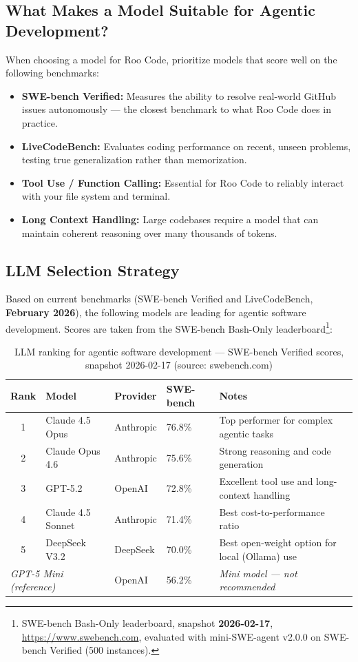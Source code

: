 \subsection{What Makes a Model Suitable for Agentic Development?}

When choosing a model for Roo Code, prioritize models that score well on the
following benchmarks:
\begin{itemize}
   \item \textbf{SWE-bench Verified:} Measures the ability to resolve
      real-world GitHub issues autonomously — the closest benchmark to what
      Roo Code does in practice.
   \item \textbf{LiveCodeBench:} Evaluates coding performance on recent,
      unseen problems, testing true generalization rather than memorization.
   \item \textbf{Tool Use / Function Calling:} Essential for Roo Code to
      reliably interact with your file system and terminal.
   \item \textbf{Long Context Handling:} Large codebases require a model that
      can maintain coherent reasoning over many thousands of tokens.
\end{itemize}

\subsection{LLM Selection Strategy}

Based on current benchmarks (SWE-bench Verified and LiveCodeBench, \textbf{February 2026}),
the following models are leading for agentic software development.
Scores are taken from the SWE-bench Bash-Only leaderboard\footnote{SWE-bench Bash-Only
leaderboard, snapshot \textbf{2026-02-17},
\url{https://www.swebench.com}, evaluated with mini-SWE-agent v2.0.0 on
SWE-bench Verified (500 instances).}:

\begin{table}[h!]
\centering
\begin{tabular}{clllp{5cm}}
   \toprule
   \textbf{Rank} & \textbf{Model} & \textbf{Provider} &
   \textbf{SWE-bench} & \textbf{Notes} \\
   \midrule
   1 & Claude 4.5 Opus  & Anthropic & 76.8\% & Top performer for complex agentic tasks \\
   2 & Claude Opus 4.6  & Anthropic & 75.6\% & Strong reasoning and code generation \\
   3 & GPT-5.2          & OpenAI    & 72.8\% & Excellent tool use and long-context handling \\
   4 & Claude 4.5 Sonnet & Anthropic & 71.4\% & Best cost-to-performance ratio \\
   5 & DeepSeek V3.2    & DeepSeek  & 70.0\% & Best open-weight option for local (Ollama) use \\
   \midrule
   \multicolumn{2}{l}{\textit{GPT-5 Mini (reference)}} & OpenAI & 56.2\% &
      \textit{Mini model — not recommended} \\
   \bottomrule
\end{tabular}
\caption{LLM ranking for agentic software development — SWE-bench Verified scores, snapshot 2026-02-17 (source: swebench.com)}
\label{tab:llm-ranking}
\end{table}

